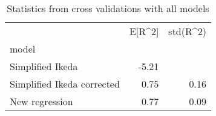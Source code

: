 
\begin{table}[H]
    \centering
    \caption{Statistics from cross validations with all models}
   \begin{tabular}{lrr}
\toprule
{} &  E[R\textasciicircum 2] &  std(R\textasciicircum 2) \\
model                      &         &           \\
\midrule
Simplified Ikeda           &   -5.21 &           \\
Simplified Ikeda corrected &    0.75 &      0.16 \\
New regression             &    0.77 &      0.09 \\
\bottomrule
\end{tabular}

    \label{tab:crossvalidation}
\end{table}
    